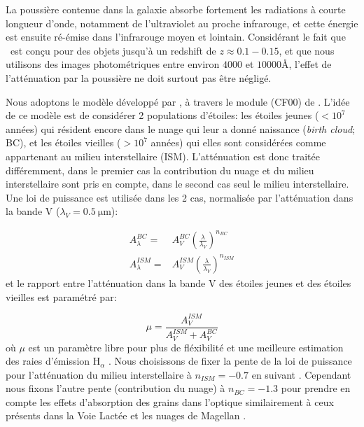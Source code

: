 \documentclass[../main/main.tex]{subfiles}
\begin{document}
La poussière contenue dans la galaxie absorbe fortement les radiations à
courte longueur d'onde, notamment de l'ultraviolet au proche infrarouge,
et cette énergie est ensuite ré-émise dans l'infrarouge moyen et
lointain. Considérant le fait que \hypergal\ est conçu pour des objets
jusqu'à un redshift de $z\approx0.1-0.15$, et que nous utilisons des
images photométriques entre environ $4000$ et $10000$\AA, l'effet de
l'atténuation par la poussière ne doit surtout pas être négligé.

Nous adoptons le modèle développé par \citet{CharlotFall2000}, à travers
le module \textbf{} (CF00) de
\cigale. L'idée de ce modèle est de considérer 2 populations d'étoiles:
les étoiles jeunes ($<10^7$ années) qui résident encore dans le nuage
qui leur a donné naissance (\textit{birth cloud}; BC), et les étoiles
vieilles ($>10^7$ années) qui elles sont considérées comme appartenant
au milieu interstellaire (ISM). L'atténuation est donc traitée
différemment, dans le premier cas la contribution du nuage et du milieu
interstellaire sont pris en compte, dans le second cas seul le milieu
interstellaire. Une loi de puissance est utilisée dans les 2 cas,
normalisée par l'atténuation dans la bande V ($\lambda_V=\SI{0.5}{\micro\metre}$):

\begin{align*}
  A_{\lambda}^{BC}=&A_{V}^{BC}\left(\frac{\lambda}{\lambda_V}\right)^{n_{BC}}\\
  A_{\lambda}^{ISM}=&A_{V}^{ISM}\left(\frac{\lambda}{\lambda_V}\right)^{n_{ISM}}
\end{align*}
et le rapport entre l'atténuation dans la bande V des étoiles jeunes et des étoiles vieilles est paramétré par:

\begin{equation*}
  \mu=\frac{A_{V}^{ISM}}{A_{V}^{ISM}+A_{V}^{BC}}
\end{equation*}
où $\mu$ est un paramètre libre pour plus de fléxibilité et une
meilleure estimation des raies d'émission $\text{H}_{\alpha}$
\citep{Battisti2016,Buat2018,Malek2018,Chevallard2019}.
Nous choisissons de fixer la pente de la loi de puissance pour
l'atténuation du milieu interstellaire à $n_{ISM}=-0.7$ en suivant
\citet{CharlotFall2000}. Cependant nous fixons l'autre pente
(contribution du nuage) à $n_{BC}=-1.3$ pour prendre en compte les
effets d'absorption des grains dans l'optique similairement à ceux
présents dans la Voie Lactée et les nuages de Magellan \citep{LoFaro2017,Wild2007,Cunha2008MAGPHYS,Battisti2019}.
\end{document}
